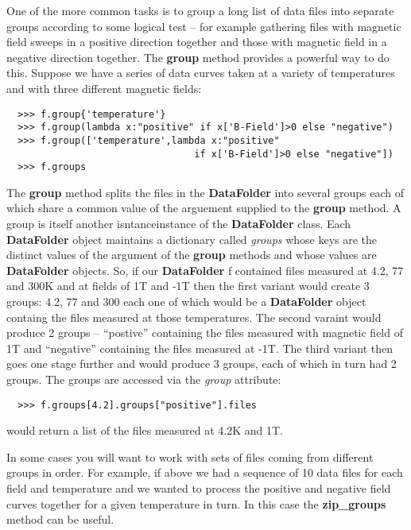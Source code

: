 \documentclass[a4paper,11pt]{scrartcl}
\begin{document}
One of the more common tasks is to group a long list of data files into separate groups according to some logical test --  for example gathering files with magnetic field sweeps in a positive direction together and those with magnetic field in a negative direction together. The \textbf{group} method provides a powerful way to do this. Suppose we have a series of data curves taken at a variety of temperatures and with three different magnetic fields:

\begin{verbatim}
  >>> f.group{'temperature'}
  >>> f.group(lambda x:"positive" if x['B-Field']>0 else "negative")
  >>> f.group(['temperature',lambda x:"positive"
                                 if x['B-Field']>0 else "negative"])
  >>> f.groups
\end{verbatim}

The \textbf{group} method splits the files in the \textbf{DataFolder} into several groups each of which share a common value of the arguement supplied to the \textbf{group} method. A group is itself another isntanceinstance of the \textbf{DataFolder} class. Each \textbf{DataFolder} object maintains a dictionary called \textit{groups} whose keys are the distinct values of the argument of the \textbf{group} methods and whose values are \textbf{DataFolder} objects. So, if our \textbf{DataFolder} f contained files measured at 4.2, 77 and 300K and at fields of 1T and -1T then the first variant would create 3 groups: 4.2, 77 and 300 each one of which would be a \textbf{DataFolder} object containg the files measured at those temperatures. The second varaint would produce 2 groups -- ``postive'' containing the files measured with magnetic field of 1T and ``negative'' containing the files measured at -1T. The third variant then goes one stage further and would produce 3 groups, each of which in turn had 2 groups. The groups are accessed via the \textit{group} attribute:

\begin{verbatim}
  >>> f.groups[4.2].groups["positive"].files
\end{verbatim}

would return a list of the files measured at 4.2K and 1T.

In some cases you will want to work with sets of files coming from different groups in order. For example, if above we had a sequence of 10 data files for each field and temperature and we wanted to process the positive and negative field curves together for a given temperature in turn. In this case the \textbf{zip\_groups} method can be useful.
\end{document}
